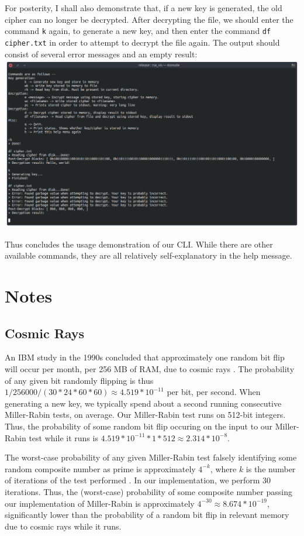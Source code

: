 \documentclass{article}
\newcommand{\code}[1]{\colorbox{light-gray}{\texttt{#1}}}
\begin{document}
For posterity, I shall also demonstrate that, if a new key is generated, the old cipher can no longer be decrypted. After decrypting the file, we should enter the command \code{k} again, to generate a new key, and then enter the command \code{df cipher.txt} in order to attempt to decrypt the file again. The output should consist of several error messages and an empty result: \\
\includegraphics[width=\textwidth]{four}

Thus concludes the usage demonstration of our CLI. While there are other available commands, they are all relatively self-explanatory in the help message.

\section{Notes}
\subsection{Cosmic Rays}
\label{sec:rays}
An IBM study in the 1990s concluded that approximately one random bit flip will occur per month, per 256 MB of RAM, due to cosmic rays \cite{cosmic}. The probability of any given bit randomly flipping is thus $1 / 256000 / (30 * 24 * 60 * 60) \approx 4.519 * 10^{-11}$ per bit, per second. When generating a new key, we typically spend about a second running consecutive Miller-Rabin tests, on average. Our Miller-Rabin test runs on 512-bit integers. Thus, the probability of some random bit flip occuring on the input to our Miller-Rabin test while it runs is $4.519 * 10^{-11} * 1 * 512 \approx 2.314 * 10^{-8}$.

The worst-case probability of any given Miller-Rabin test falsely identifying some random composite number as prime is approximately $4^{-k }$, where $k$ is the number of iterations of the test performed \cite{wolfram}. In our implementation, we perform 30 iterations. Thus, the (worst-case) probability of some composite number passing our implementation of Miller-Rabin is approximately $4^{-30} \approx 8.674 * 10^{-19}$, significantly lower than the probability of a random bit flip in relevant memory due to cosmic rays while it runs.
\end{document}

